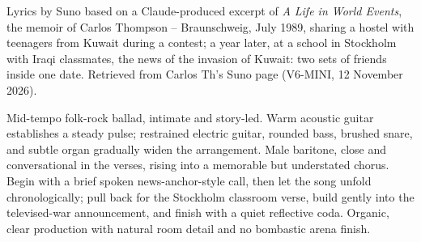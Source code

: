 
\label{sec:a-borrowed-time}
\begin{notes}
Lyrics by Suno based on a Claude-produced excerpt of \emph{A Life in World Events}, the memoir of Carlos Thompson -- Braunschweig, July 1989, sharing a hostel with teenagers from Kuwait during a contest; a year later, at a school in Stockholm with Iraqi classmates, the news of the invasion of Kuwait: two sets of friends inside one date. Retrieved from Carlos Th's Suno page (V6-MINI, 12 November 2026).
\end{notes}
\begin{style}
Mid-tempo folk-rock ballad, intimate and story-led. Warm acoustic guitar establishes a steady pulse; restrained electric guitar, rounded bass, brushed snare, and subtle organ gradually widen the arrangement. Male baritone, close and conversational in the verses, rising into a memorable but understated chorus. Begin with a brief spoken news-anchor-style call, then let the song unfold chronologically; pull back for the Stockholm classroom verse, build gently into the televised-war announcement, and finish with a quiet reflective coda. Organic, clear production with natural room detail and no bombastic arena finish.
\end{style}
